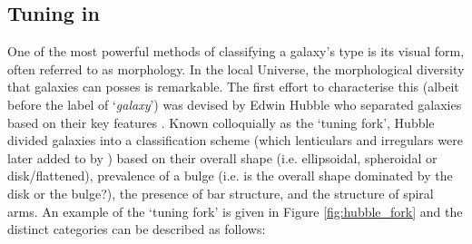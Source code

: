 \subsection{Tuning in}
One of the most powerful methods of classifying a galaxy's type is its visual form, often referred to as morphology. In the local Universe, the morphological diversity that galaxies can posses is remarkable. The first effort to characterise this (albeit before the label of `\textit{galaxy}') was devised by Edwin Hubble who separated galaxies based on their key features \citep{hubble1926, hubble1936}. Known colloquially as the `tuning fork', Hubble divided galaxies into a classification scheme (which lenticulars and irregulars were later added to by \citet{Vaucouleurs1959}) based on their overall shape (i.e. ellipsoidal, spheroidal or disk/flattened), prevalence of a bulge (i.e. is the overall shape dominated by the disk or the bulge?), the presence of bar structure, and the structure of spiral arms. An example of the `tuning fork' is given in Figure \ref{fig:hubble_fork} and the distinct categories can be described as follows:

